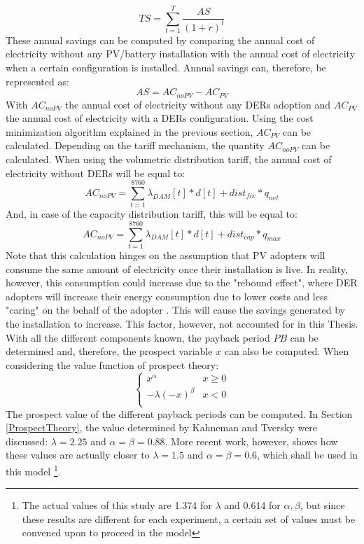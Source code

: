 \begin{equation}
    TS = \sum_{t=1}^{T} \frac{AS}{(1+r)^t}
\end{equation}
These annual savings can be computed by comparing the annual cost of electricity without any PV/battery installation with the annual cost of electricity when a certain configuration is installed. Annual savings can, therefore, be represented as:
\begin{equation}
    AS = AC_{noPV} - AC_{PV}
\end{equation}
With $AC_{noPV}$ the annual cost of electricity without any DERs adoption and $AC_{PV}$ the annual cost of electricity with a DERs configuration. Using the cost minimization algorithm explained in the previous section, $AC_{PV}$ can be calculated. Depending on the tariff mechanism, the quantity $AC_{noPV}$ can be calculated. When using the volumetric distribution tariff, the annual cost of electricity without DERs will be equal to:
\begin{equation}
    AC_{noPV} = \sum_{t = 1}^{8760} \lambda_{DAM}[t]*d[t] +  dist_{fix}*q_{net}
\end{equation}
And, in case of the capacity distribution tariff, this will be equal to:
\begin{equation}
    AC_{noPV} = \sum_{t = 1}^{8760} \lambda_{DAM}[t]*d[t] + dist_{cap}*q_{max}
\end{equation}
Note that this calculation hinges on the assumption that PV adopters will consume the same amount of electricity once their installation is live. In reality, however, this consumption could increase due to the "rebound effect", where DER adopters will increase their energy consumption due to lower costs and less "caring" on the behalf of the adopter \cite{solarrebound}. This will cause the savings generated by the installation to increase. This factor, however, not accounted for in this Thesis. 
\newline \newline \noindent
With all the different components known, the payback period $PB$ can be determined and, therefore, the prospect variable $x$ can also be computed. When considering the value function of prospect theory:
\[   \left\{
\begin{array}{ll}
      x^\alpha & x \geq 0 \\
       -\lambda(-x)^\beta & x < 0 \\
\end{array} 
\right. \]
\newline 
The prospect value of the different payback periods can be computed. In Section \ref{ProspectTheory}, the value determined by Kahneman and Tversky were discussed: $\lambda = 2.25$ and $\alpha = \beta = 0.88$. More recent work, however, shows how these values are actually closer to $\lambda = 1.5$ and $\alpha = \beta = 0.6$, which shall be used in this model \cite{lossaversions}\footnote{The actual values of this study are 1.374 for $\lambda$ and 0.614 for $\alpha, \beta$, but since these results are different for each experiment, a certain set of values must be convened upon to proceed in the model}. 
